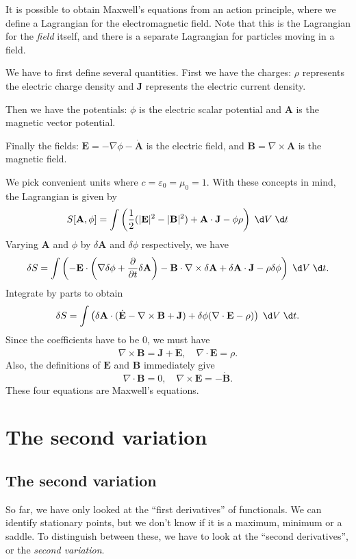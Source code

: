 \documentclass[a4paper]{article}
\begin{document}
\begin{eg}
  It is possible to obtain Maxwell's equations from an action principle, where we define a Lagrangian for the electromagnetic field. Note that this is the Lagrangian for the \emph{field} itself, and there is a separate Lagrangian for particles moving in a field.

  We have to first define several quantities. First we have the charges: $\rho$ represents the electric charge density and $\mathbf{J}$ represents the electric current density.

  Then we have the potentials: $\phi$ is the electric scalar potential and $\mathbf{A}$ is the magnetic vector potential.

  Finally the fields: $\mathbf{E} = -\nabla \phi - \dot{\mathbf{A}}$ is the electric field, and $\mathbf{B} = \nabla\times \mathbf{A}$ is the magnetic field.

  We pick convenient units where $c = \varepsilon_0 = \mu_0 = 1$. With these concepts in mind, the Lagrangian is given by
  \[
    S[\mathbf{A}, \phi] = \int \left(\frac{1}{2}(|\mathbf{E}|^2 - |\mathbf{B}|^2) + \mathbf{A}\cdot \mathbf{J} - \phi \rho\right)\;\d V\;\d t
  \]
  Varying $\mathbf{A}$ and $\phi$ by $\delta \mathbf{A}$ and $\delta \phi$ respectively, we have
  \[
    \delta S = \int \left(-\mathbf{E}\cdot \left(\nabla \delta\phi + \frac{\partial}{\partial t} \delta \mathbf{A}\right) - \mathbf{B}\cdot \nabla \times \delta \mathbf{A} + \delta \mathbf{A}\cdot \mathbf{J} - \rho\delta\phi\right)\;\d V\;\d t.
  \]
  Integrate by parts to obtain
  \[
    \delta S = \int\left(\delta\mathbf{A}\cdot (\dot{\mathbf{E}} - \nabla\times \mathbf{B} + \mathbf{J}) + \delta \phi(\nabla\cdot \mathbf{E} - \rho)\right)\;\d V\;\d t.
  \]
  Since the coefficients have to be $0$, we must have
  \[
    \nabla \times \mathbf{B} = \mathbf{J} + \dot{\mathbf{E}},\quad \nabla \cdot \mathbf{E} = \rho.
  \]
  Also, the definitions of $\mathbf{E}$ and $\mathbf{B}$ immediately give
  \[
    \nabla\cdot \mathbf{B} = 0,\quad \nabla \times \mathbf{E} = - \dot{\mathbf{B}}.
  \]
  These four equations are Maxwell's equations.
\end{eg}
\section{The second variation}
\subsection{The second variation}
So far, we have only looked at the ``first derivatives'' of functionals. We can identify stationary points, but we don't know if it is a maximum, minimum or a saddle. To distinguish between these, we have to look at the ``second derivatives'', or the \emph{second variation}.
\end{document}
